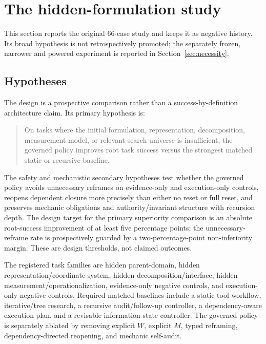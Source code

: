 \section{The hidden-formulation study}
\label{sec:hidden-formulation}

This section reports the original 66-case study and keeps it as negative
history. Its broad hypothesis is not retrospectively promoted; the separately
frozen, narrower and powered experiment is reported in
Section~\ref{sec:necessity}.

\subsection{Hypotheses}

The design is a prospective comparison rather than a success-by-definition
architecture claim. Its primary hypothesis is:

\begin{quote}
On tasks where the initial formulation, representation, decomposition,
measurement model, or relevant search universe is insufficient, the governed
policy improves root task success versus the strongest matched static or
recursive baseline.
\end{quote}

The safety and mechanistic secondary hypotheses test whether the governed policy
avoids unnecessary reframes on evidence-only and execution-only controls,
reopens dependent closure more precisely than either no reset or full reset, and
preserves mechanic obligations and authority/invariant structure with recursion
depth. The design target for the primary superiority comparison is an absolute
root-success improvement of at least five percentage points; the
unnecessary-reframe rate is prospectively guarded by a two-percentage-point
non-inferiority margin. These are design thresholds, not claimed outcomes.

The registered task families are hidden parent-domain, hidden
representation/coordinate system, hidden decomposition/interface, hidden
measurement/operationalization, evidence-only negative controls, and
execution-only negative controls. Required matched baselines include a static
tool workflow, iterative/tree research, a recursive audit/follow-up controller,
a dependency-aware execution plan, and a revisable information-state controller.
The governed policy is separately ablated by removing explicit $W$, explicit
$M$, typed reframing, dependency-directed reopening, and mechanic self-audit.

